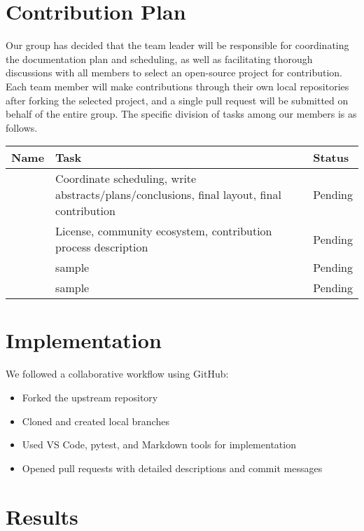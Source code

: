\documentclass[12pt]{article}
\begin{document}
\section{Contribution Plan}

Our group has decided that the team leader will be responsible for coordinating the documentation plan and scheduling, as well as facilitating thorough discussions with all members to select an open-source project for contribution. Each team member will make contributions through their own local repositories after forking the selected project, and a single pull request will be submitted on behalf of the entire group. The specific division of tasks among our members is as follows.

\begin{longtable}{|p{3cm}|p{7cm}|p{3cm}|}
\hline
\textbf{Name} & \textbf{Task} & \textbf{Status} \\
\hline
 & Coordinate scheduling, write abstracts/plans/conclusions, final layout, final contribution & Pending \\
\hline
 & License, community ecosystem, contribution process description & Pending \\
\hline
 & sample & Pending \\
\hline
 & sample & Pending \\
\hline
\end{longtable}

\section{Implementation}

We followed a collaborative workflow using GitHub:

\begin{itemize}
    \item Forked the upstream repository
    \item Cloned and created local branches
    \item Used VS Code, pytest, and Markdown tools for implementation
    \item Opened pull requests with detailed descriptions and commit messages
\end{itemize}

\section{Results}
\end{document}
